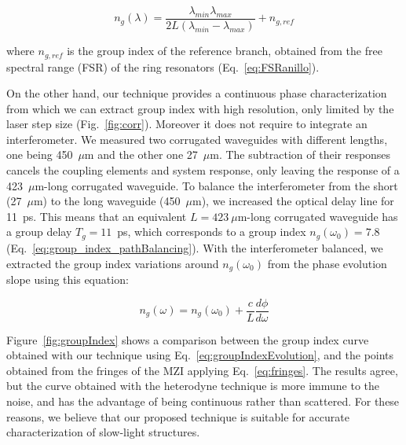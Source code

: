 \documentclass[journal]{IEEEtran}
\begin{document}
\begin{equation}
  n_g (\lambda)=\frac{\lambda_{min} \lambda_{max}}{ 2L (\lambda_{min} - \lambda_{max})} + n_{g,ref}
\label{eq:fringes}
\end{equation}

where $n_{g,ref}$ is the group index of the reference branch, obtained from the free spectral range (FSR) of the ring resonators (Eq.~\ref{eq:FSRanillo}).  %

On the other hand, our technique provides a continuous phase characterization from which we can extract group index with high resolution, only limited by the laser step size (Fig.~\ref{fig:corr}).
Moreover it does not require to integrate an interferometer.
We measured two corrugated waveguides with different lengths, one being 450~$\mu$m and the other one 27~$\mu$m.
The subtraction of their responses cancels the coupling elements and system response, only leaving the response of a 423~$\mu$m-long corrugated waveguide.
To balance the interferometer from the short (27~$\mu$m) to the long waveguide (450~$\mu$m), we increased the optical delay line for 11~ps.
This means that an equivalent $L=423~\mu$m-long corrugated waveguide has a group delay $T_g=11$~ps, which corresponds to a group index $n_g(\omega_0)=7.8$ (Eq.~\ref{eq:group_index_pathBalancing}).
With the interferometer balanced, we extracted the group index variations around $n_g(\omega_0)$ from the phase evolution slope using this equation:

\begin{equation}
  n_g (\omega)=  n_g(\omega_0) + \frac{c}{L} \frac{d\phi}{d\omega}
 \label{eq:groupIndexEvolution}
\end{equation}

Figure~\ref{fig:groupIndex} shows a comparison between the group index curve obtained with our technique using Eq.~\ref{eq:groupIndexEvolution}, and the points obtained from the fringes of the MZI applying Eq.~\ref{eq:fringes}.
The results agree, but the curve obtained with the heterodyne technique is more immune to the noise, and has the advantage of being continuous rather than scattered.
For these reasons, we believe that our proposed technique is suitable for accurate characterization of slow-light structures.
\end{document}
